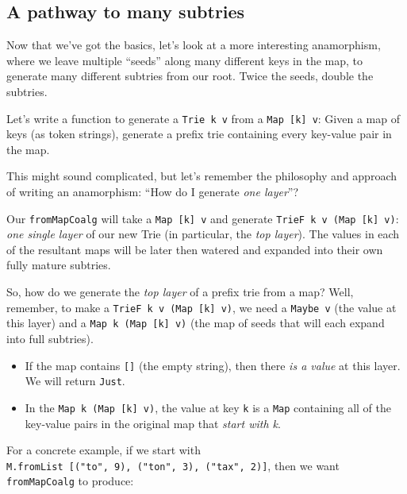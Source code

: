 \documentclass[]{article}
\begin{document}
\subsection{A pathway to many subtries}\label{a-pathway-to-many-subtries}

Now that we've got the basics, let's look at a more interesting anamorphism,
where we leave multiple ``seeds'' along many different keys in the map, to
generate many different subtries from our root. Twice the seeds, double the
subtries.

Let's write a function to generate a \texttt{Trie\ k\ v} from a
\texttt{Map\ {[}k{]}\ v}: Given a map of keys (as token strings), generate a
prefix trie containing every key-value pair in the map.

This might sound complicated, but let's remember the philosophy and approach of
writing an anamorphism: ``How do I generate \emph{one layer}''?

Our \texttt{fromMapCoalg} will take a \texttt{Map\ {[}k{]}\ v} and generate
\texttt{TrieF\ k\ v\ (Map\ {[}k{]}\ v)}: \emph{one single layer} of our new Trie
(in particular, the \emph{top layer}). The values in each of the resultant maps
will be later then watered and expanded into their own fully mature subtries.

So, how do we generate the \emph{top layer} of a prefix trie from a map? Well,
remember, to make a \texttt{TrieF\ k\ v\ (Map\ {[}k{]}\ v)}, we need a
\texttt{Maybe\ v} (the value at this layer) and a
\texttt{Map\ k\ (Map\ {[}k{]}\ v)} (the map of seeds that will each expand into
full subtries).

\begin{itemize}
\tightlist
\item
  If the map contains \texttt{{[}{]}} (the empty string), then there \emph{is a
  value} at this layer. We will return \texttt{Just}.
\item
  In the \texttt{Map\ k\ (Map\ {[}k{]}\ v)}, the value at key \texttt{k} is a
  \texttt{Map} containing all of the key-value pairs in the original map that
  \emph{start with k}.
\end{itemize}

For a concrete example, if we start with
\texttt{M.fromList\ {[}("to",\ 9),\ ("ton",\ 3),\ ("tax",\ 2){]}}, then we want
\texttt{fromMapCoalg} to produce:
\end{document}
